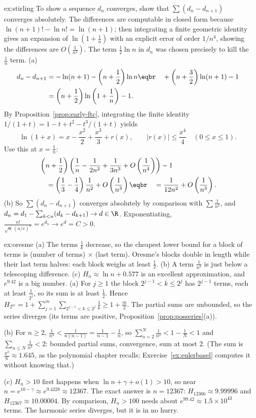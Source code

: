 \begin{solution}{ex:stirling}
\idea To show a sequence $d_n$ converges, show that $\sum(d_n-d_{n+1})$ converges absolutely. The differences are computable in closed form because $\ln(n+1)!-\ln n!=\ln(n+1)$; then integrating a finite geometric identity gives an expansion of $\ln(1+\frac1n)$ with an explicit error of order $1/n^4$, showing the differences are $O(\frac1{n^2})$. The term $\frac12\ln n$ in $d_n$ was chosen precisely to kill the $\frac1n$ term.
\writeup (a)
\[\begin{aligned}d_n-d_{n+1}&=-\ln(n+1)-\left(n+\frac12\right)\ln n\eqbr\quad+\left(n+\frac32\right)\ln(n+1)-1\\&=\left(n+\frac12\right)\ln\left(1+\frac1n\right)-1.\end{aligned}\]
By Proposition~\ref{prop:early-ftc}, integrating the finite identity
$1/(1+t)=1-t+t^2-t^3/(1+t)$ yields
\[
\ln(1+x)=x-\frac{x^2}2+\frac{x^3}3+r(x),
\qquad |r(x)|\le\frac{x^4}4\quad(0\le x\le1).
\]
Use this at $x=\frac1n$:
\[
\begin{aligned}&\left(n+\frac12\right)\left(\frac1n-\frac1{2n^2}+\frac1{3n^3}+O\left(\frac1{n^4}\right)\right)-1\\
&\quad=\left(\frac13-\frac14\right)\frac1{n^2}+O\left(\frac1{n^3}\right)\eqbr\quad=\frac1{12n^2}+O\left(\frac1{n^3}\right).\end{aligned}
\]
(b) So $\sum(d_n-d_{n+1})$ converges absolutely by comparison with $\sum\frac1{n^2}$, and $d_n=d_1-\sum_{k<n}(d_k-d_{k+1})\to d\in\R$. Exponentiating,
$\frac{n!}{\sqrt n\,(n/e)^n}=e^{d_n}\to e^d=C>0$.
\end{solution}


\begin{solution}{ex:oresme}
\idea (a) The terms $\frac1k$ decrease, so the cheapest lower bound for a block of terms is (number of terms) $\times$ (last term). Oresme's blocks double in length while their last term halves: each block weighs at least $\frac12$. (b) A term $\frac1{n^2}$ is just below a telescoping difference. (c) $H_n\approx\ln n+0.577$ is an excellent approximation, and $e^{9.42}$ is a big number.
\writeup (a) For $j\ge1$ the block $2^{j-1}<k\le2^j$ has $2^{j-1}$ terms, each at least $\frac1{2^j}$, so its sum is at least $\frac12$. Hence
$H_{2^m}=1+\sum_{j=1}^m\sum_{2^{j-1}<k\le2^j}\frac1k\ge1+\frac m2$. The partial sums are unbounded, so the series diverges (its terms are positive, Proposition~\ref{prop:posseries}(a)).

(b) For $n\ge2$, $\frac1{n^2}<\frac1{n(n-1)}=\frac1{n-1}-\frac1n$, so $\sum_{n=2}^N\frac1{n^2}<1-\frac1N<1$ and $\sum_{n\le N}\frac1{n^2}<2$: bounded partial sums, convergence, sum at most $2$. (The sum is $\frac{\pi^2}6\approx1.645$, as the polynomial chapter recalls; Exercise~\ref{ex:eulerbasel} computes it without knowing that.)

(c) $H_n>10$ first happens when $\ln n+\gamma+o(1)>10$, so near $n=e^{10-\gamma}\approx e^{9.4228}\approx12367$. The exact answer is $n=12367$: $H_{12366}\approx9.99996$ and $H_{12367}\approx10.00004$. By comparison, $H_n>100$ needs about $e^{99.42}\approx1.5\times10^{43}$ terms. The harmonic series diverges, but it is in no hurry.
\end{solution}

